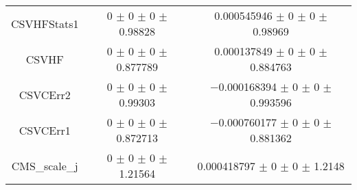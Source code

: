 \begin{table}
\begin{tabular}{ccc}
CSVHFStats1 & \num{0} $\pm$ \num{0} $\pm$ \num{0} $\pm$ \num{0.98828} & \num{0.000545946} $\pm$ \num{0} $\pm$ \num{0} $\pm$ \num{0.98969}\\
CSVHF & \num{0} $\pm$ \num{0} $\pm$ \num{0} $\pm$ \num{0.877789} & \num{0.000137849} $\pm$ \num{0} $\pm$ \num{0} $\pm$ \num{0.884763}\\
CSVCErr2 & \num{0} $\pm$ \num{0} $\pm$ \num{0} $\pm$ \num{0.99303} & \num{-0.000168394} $\pm$ \num{0} $\pm$ \num{0} $\pm$ \num{0.993596}\\
CSVCErr1 & \num{0} $\pm$ \num{0} $\pm$ \num{0} $\pm$ \num{0.872713} & \num{-0.000760177} $\pm$ \num{0} $\pm$ \num{0} $\pm$ \num{0.881362}\\
CMS\_scale\_j & \num{0} $\pm$ \num{0} $\pm$ \num{0} $\pm$ \num{1.21564} & \num{0.000418797} $\pm$ \num{0} $\pm$ \num{0} $\pm$ \num{1.2148}\\
\bottomrule
\end{tabular}
\end{table}